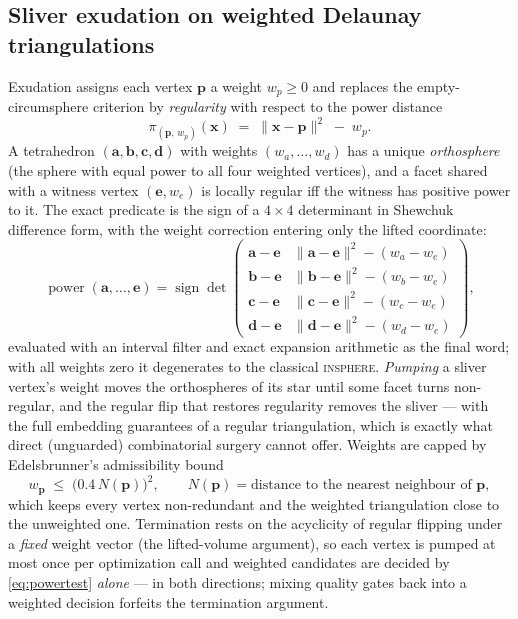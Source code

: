 \documentclass[11pt,a4paper]{article}
\numberwithin{equation}{section}
\newcommand{\vv}[1]{\mathbf{#1}}
\begin{document}
\subsection{Sliver exudation on weighted Delaunay triangulations}
Exudation \cite{ChengDeyEdelsbrunner2000,EdelsbrunnerGuoy2002} assigns each
vertex $\vv p$ a weight $w_p\ge 0$ and replaces the empty-circumsphere
criterion by \emph{regularity} with respect to the power distance
\begin{equation}
\pi_{(\vv p,\,w_p)}(\vv x) \;=\; \lVert\vv x-\vv p\rVert^{2} \;-\; w_p .
\label{eq:power}
\end{equation}
A tetrahedron $(\vv a,\vv b,\vv c,\vv d)$ with weights $(w_a,\dots,w_d)$ has a
unique \emph{orthosphere} (the sphere with equal power to all four weighted
vertices), and a facet shared with a witness vertex $(\vv e,w_e)$ is locally
regular iff the witness has positive power to it. The exact predicate is the
sign of a $4\times4$ determinant in Shewchuk difference form, with the weight
correction entering only the lifted coordinate:
\begin{equation}
\operatorname{power}(\vv a,\dots,\vv e)
=\operatorname{sign}\det
\begin{pmatrix}
\vv a-\vv e & \lVert\vv a-\vv e\rVert^{2}-(w_a-w_e)\\
\vv b-\vv e & \lVert\vv b-\vv e\rVert^{2}-(w_b-w_e)\\
\vv c-\vv e & \lVert\vv c-\vv e\rVert^{2}-(w_c-w_e)\\
\vv d-\vv e & \lVert\vv d-\vv e\rVert^{2}-(w_d-w_e)
\end{pmatrix},
\label{eq:powertest}
\end{equation}
evaluated with an interval filter and exact expansion arithmetic as the final
word; with all weights zero it degenerates to the classical
\textsc{insphere}. \emph{Pumping} a sliver vertex's weight moves the
orthospheres of its star until some facet turns non-regular, and the regular
flip that restores regularity removes the sliver --- with the full embedding
guarantees of a regular triangulation, which is exactly what direct
(unguarded) combinatorial surgery cannot offer. Weights are capped by
Edelsbrunner's admissibility bound
\begin{equation}
w_{\vv p}\;\le\;\bigl(0.4\, N(\vv p)\bigr)^{2},\qquad
N(\vv p)=\text{distance to the nearest neighbour of }\vv p,
\label{eq:weightcap}
\end{equation}
which keeps every vertex non-redundant and the weighted triangulation close to
the unweighted one. Termination rests on the acyclicity of regular flipping
under a \emph{fixed} weight vector (the lifted-volume argument), so each
vertex is pumped at most once per optimization call and weighted candidates
are decided by \eqref{eq:powertest} \emph{alone} --- in both directions;
mixing quality gates back into a weighted decision forfeits the termination
argument.
\end{document}

